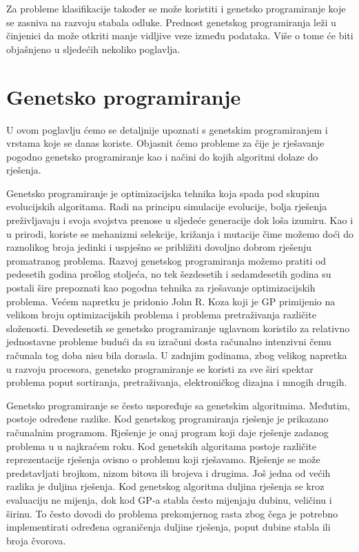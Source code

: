 \documentclass[times, utf8, zavrsni]{fer}
\begin{document}
Za probleme klasifikacije također se može koristiti i genetsko programiranje koje se zasniva na razvoju stabala odluke. Prednost genetskog programiranja leži u činjenici da može otkriti manje vidljive veze između podataka. Više o tome će biti objašnjeno u sljedećih nekoliko poglavlja.


\chapter{Genetsko programiranje}
U ovom poglavlju ćemo se detaljnije upoznati s genetskim programiranjem i vrstama koje se danas koriste. Objasnit ćemo probleme za čije je rješavanje pogodno genetsko programiranje kao i načini do kojih algoritmi dolaze do rješenja.

Genetsko programiranje je optimizacijska tehnika koja spada pod skupinu evolucijskih algoritama. Radi na principu simulacije evolucije, bolja rješenja preživljavaju i svoja svojstva prenose u sljedeće generacije dok loša izumiru. Kao i u prirodi, koriste se mehanizmi selekcije, križanja i mutacije čime možemo doći do raznolikog broja jedinki i uspješno se približiti dovoljno dobrom rješenju promatranog problema. Razvoj genetskog programiranja možemo pratiti od pedesetih godina prošlog stoljeća, no tek šezdesetih i sedamdesetih godina su postali šire prepoznati kao pogodna tehnika za rješavanje optimizacijskih problema. Većem napretku je pridonio John R. Koza koji je GP primijenio na velikom broju optimizacijskih problema i problema pretraživanja različite složenosti. Devedesetih se genetsko programiranje uglavnom koristilo za relativno jednostavne probleme budući da su izračuni dosta računalno intenzivni čemu računala tog doba nisu bila dorasla. U zadnjim godinama, zbog velikog napretka u razvoju procesora, genetsko programiranje se koristi za sve širi spektar problema poput sortiranja, pretraživanja, elektroničkog dizajna i mnogih drugih. 

Genetsko programiranje se često uspoređuje sa genetskim algoritmima. Međutim, postoje određene razlike. Kod genetskog programiranja rješenje je prikazano računalnim programom. Rješenje je onaj program koji daje rješenje zadanog problema u u najkraćem roku. Kod genetskih algoritama postoje različite reprezentacije rješenja ovisno o problemu koji rješavamo. Rješenje se može predstavljati brojkom, nizom bitova ili brojeva i drugima. Još jedna od većih razlika je duljina rješenja. Kod genetskog algoritma duljina rješenja se kroz evaluaciju ne mijenja, dok kod GP-a stabla često mijenjaju dubinu, veličinu i širinu. To često dovodi do problema prekomjernog rasta zbog čega je potrebno implementirati određena ograničenja duljine rješenja, poput dubine stabla ili broja čvorova.
\end{document}
